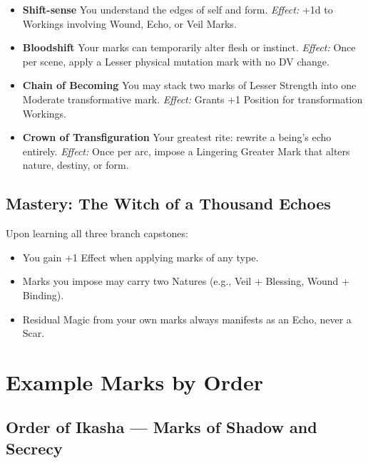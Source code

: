 \documentclass[11pt]{book}
\begin{document}
\begin{itemize}[leftmargin=2em]
    \item \textbf{Shift-sense}  
    You understand the edges of self and form.  
    \emph{Effect:} +1d to Workings involving Wound, Echo, or Veil Marks.

    \item \textbf{Bloodshift}  
    Your marks can temporarily alter flesh or instinct.  
    \emph{Effect:} Once per scene, apply a Lesser physical mutation mark with no DV change.

    \item \textbf{Chain of Becoming}  
    You may stack two marks of Lesser Strength into one Moderate transformative mark.  
    \emph{Effect:} Grants +1 Position for transformation Workings.

    \item \textbf{Crown of Transfiguration}  
    Your greatest rite: rewrite a being's echo entirely.  
    \emph{Effect:} Once per arc, impose a Lingering Greater Mark that alters nature, destiny, or form.
\end{itemize}

\subsection*{Mastery: The Witch of a Thousand Echoes}

Upon learning all three branch capstones:

\begin{itemize}[noitemsep]
    \item You gain +1 Effect when applying marks of any type.
    \item Marks you impose may carry two Natures (e.g., Veil + Blessing, Wound + Binding).
    \item Residual Magic from your own marks always manifests as an Echo, never a Scar.
\end{itemize}

\section*{Example Marks by Order}

\subsection*{Order of Ikasha --- Marks of Shadow and Secrecy}
\end{document}
